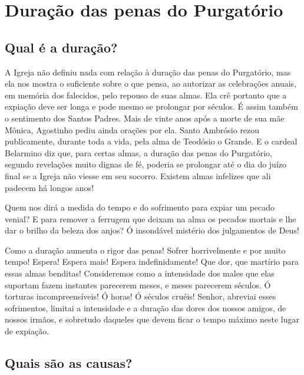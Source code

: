 \renewcommand{\thechapterdisplay}{Oitavo dia}
\renewcommand{\thechapterrunner}{Duração das penas do Purgatório}
\chapter[Oitavo dia --- Duração das penas do Purgatório]{Duração das penas do Purgatório}
\section*{Qual é a duração?}

A Igreja não definiu nada com relação à duração das penas do Purgatório, mas ela nos mostra o suficiente sobre o que pensa, ao autorizar as celebrações anuais, em memória dos falecidos, pelo repouso de suas almas. Ela crê portanto que a expiação deve ser longa e pode mesmo se prolongar por séculos. É assim também o sentimento dos Santos Padres. Mais de vinte anos após a morte de sua mãe Mônica, Agostinho pediu ainda orações por ela. Santo Ambrósio rezou publicamente, durante toda a vida, pela alma de Teodósio o Grande. E o cardeal Belarmino diz que, para certas almas, a duração das penas do Purgatório, segundo revelações muito dignas de fé, poderia se prolongar até o dia do juízo final se a Igreja não viesse em seu socorro. Existem almas infelizes que ali padecem há longos anos! 

Quem nos dirá a medida do tempo e do sofrimento para expiar um pecado venial? E para remover a ferrugem que deixam na alma os pecados mortais e lhe dar o brilho da beleza dos anjos? Ó insondável mistério dos julgamentos de Deus!

Como a duração aumenta o rigor das penas! Sofrer horrivelmente e por muito tempo! Espera! Espera mais! Espera indefinidamente! Que dor, que martírio para essas almas benditas! Consideremos como a intensidade dos males que elas suportam fazem instantes parecerem meses, e meses parecerem séculos. Ó torturas incompreensíveis! Ó horas! Ó séculos cruéis! Senhor, abreviai esses sofrimentos, limitai a intensidade e a duração das dores dos nossos amigos, de nossos irmãos, e sobretudo daqueles que devem ficar o tempo máximo neste lugar de expiação.


\section*{Quais são as causas?}

